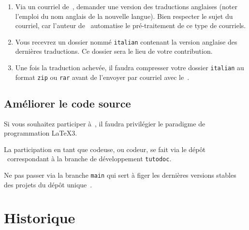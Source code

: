 \begin{enumerate}
    \item Via un courriel de \,, demander une version des traductions anglaises (noter l'emploi du nom anglais de la nouvelle langue).
    Bien respecter le sujet du courriel, car l'auteur de \thisproj\ automatise le pré-traitement de ce type de courriels.

    \item Vous recevrez un dossier nommé \verb#italian# contenant la version anglaise des dernières traductions.
    Ce dossier sera le lieu de votre contribution.

    \item Une fois la traduction achevée, il faudra compresser votre dossier \verb#italian# au format \verb#zip# ou \verb#rar# avant de l'envoyer par courriel avec le \,.
\end{enumerate}



\subsection{Améliorer le code source}

\begin{tdocimp}
    Si vous souhaitez participer à \thisproj\,, il faudra privilégier le paradigme de programmation \LaTeX3.
\end{tdocimp}


La participation en tant que codeuse, ou codeur, se fait via le dépôt \thisrepo\ correspondant à la branche de développement \verb#tutodoc#.


\begin{tdoccaut}
	Ne pas passer via la branche \verb#main# qui sert à figer les dernières versions stables des projets du dépôt unique \thismonorepo\,.
\end{tdoccaut}


\section{Historique}

\small

